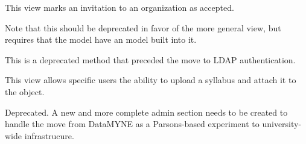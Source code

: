 \documentclass[letterpaper,10pt,english]{sphinxmanual}
\begin{document}

\begin{fulllineitems}
\label{generated/apps.profiles.views:apps.profiles.views.accept_organization_invitation}
This view marks an invitation to an organization as accepted.

Note that this should be deprecated in favor of the more general
 view, but requires that the 
model have an  model built into it.

\end{fulllineitems}



\begin{fulllineitems}
\label{generated/apps.profiles.views:apps.profiles.views.activate}
This is a deprecated method that preceded the move to LDAP authentication.

\end{fulllineitems}



\begin{fulllineitems}
\label{generated/apps.profiles.views:apps.profiles.views.add_syllabus}
This view allows specific users the ability to upload a syllabus
and attach it to the  object.

\end{fulllineitems}



\begin{fulllineitems}
\label{generated/apps.profiles.views:apps.profiles.views.admin}
Deprecated.  A new and more complete admin section needs to be created to
handle the move from DataMYNE as a Parsons-based experiment to university-
wide infrastrucure.

\end{fulllineitems}
\end{document}
